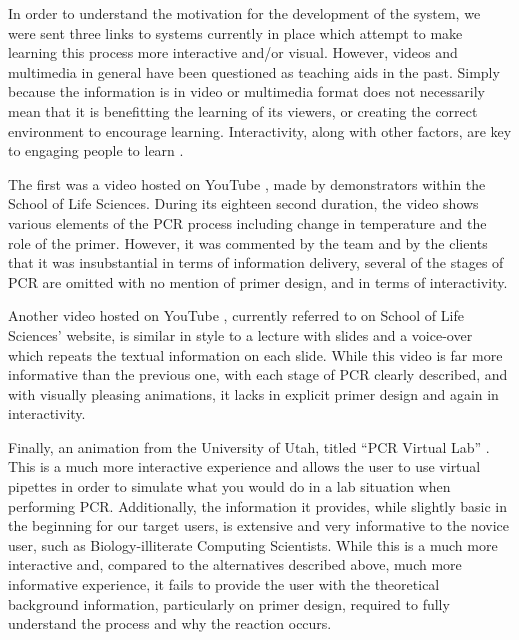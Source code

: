 In order to understand the motivation for the development of the
system, we were sent three links to systems currently in place which
attempt to make learning this process more interactive and/or visual.
However, videos and multimedia in general have been questioned as
teaching aids in the past.
Simply because the information is in video or multimedia format
does not necessarily mean that it is benefitting the learning of its
viewers, or creating the correct environment to encourage learning.
Interactivity, along with other factors, are key to engaging people to
learn \citep{gamingRedefines2004}.

The first was a video hosted on YouTube \citep{youtube:taqExtension},
made by demonstrators within the School of Life Sciences.
During its eighteen second duration, the video shows various elements
of the PCR process including change in temperature and the role of the
primer.
However, it was commented by the team and by the clients that it was
insubstantial in terms of information delivery, several of the stages
of PCR are omitted with no mention of primer design, and in terms
of interactivity.

Another video hosted on YouTube \citep{youtube:PCR}, currently referred
to on School of Life Sciences' website, is similar in style to a
lecture with slides and a voice-over which repeats the textual
information on each slide.
While this video is far more informative than the previous one, with
each stage of PCR clearly described, and with visually pleasing
animations, it lacks in explicit primer design and again in
interactivity.

Finally, an animation from the University of Utah, titled ``PCR
Virtual Lab'' \citep{genScienceCenter2012}.
This is a much more interactive experience and allows the user to use
virtual pipettes in order to simulate what you would do in a lab
situation when performing PCR.
Additionally, the information it provides, while slightly basic in the
beginning for our target users, is extensive and very informative to
the novice user, such as Biology-illiterate Computing Scientists.
While this is a much more interactive and, compared to the
alternatives described above, much more informative experience, it
fails to provide the user with the theoretical background information,
particularly on primer design, required to fully understand the
process and why the reaction occurs.
